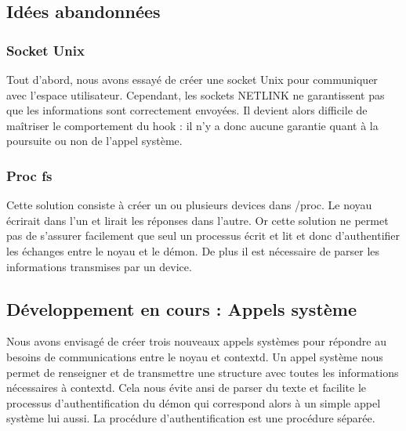 \documentclass[pdftex,a4paper,titlepage,11pt,openright]{article}
\begin{document}
\newpage

\subsection{Idées abandonnées}

\subsubsection{Socket Unix}

Tout d'abord, nous avons essayé de créer une socket Unix pour communiquer avec l'espace utilisateur. Cependant, les sockets NETLINK ne garantissent pas que les informations sont correctement envoyées. Il devient alors difficile de maîtriser le comportement du hook : il n'y a donc aucune garantie quant à la poursuite ou non de l'appel système.

\subsubsection{Proc fs}

Cette solution consiste à créer un ou plusieurs devices dans /proc. Le noyau écrirait dans l'un et lirait les réponses dans l'autre. Or cette solution ne permet pas de s'assurer facilement que seul un processus écrit et lit et donc d'authentifier les échanges entre le noyau et le démon. De plus il est nécessaire de parser les informations transmises par un device.

\subsection{Développement en cours : Appels système}

Nous avons envisagé de créer trois nouveaux appels systèmes pour répondre au besoins de communications entre le noyau et contextd. Un appel système nous permet de renseigner et de transmettre une structure avec toutes les informations nécessaires à contextd. Cela nous évite ansi de parser du texte et facilite le processus d'authentification du démon qui correspond alors à un simple appel système lui aussi. La procédure d'authentification est une procédure séparée.
\end{document}
